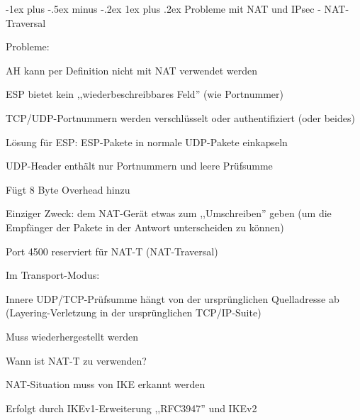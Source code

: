 \documentclass[a4paper]{article}
\makeatletter
\renewcommand{\subsubsection}{\@startsection{subsubsection}{3}{0mm}%
 {-1ex plus -.5ex minus -.2ex}%
 {1ex plus .2ex}%
 {\normalfont\small\bfseries}}
\makeatother
\begin{document}
\begin{multicols}{3}
      \subsubsection{Probleme mit NAT und IPsec - NAT-Traversal}
      \begin{itemize*}
            \item Probleme:
            \begin{itemize*}
                  \item AH kann per Definition nicht mit NAT verwendet werden
                  \item ESP bietet kein ,,wiederbeschreibbares Feld'' (wie Portnummer)
                  \item TCP/UDP-Portnummern werden verschlüsselt oder authentifiziert (oder beides)
            \end{itemize*}
            \item Lösung für ESP: ESP-Pakete in normale UDP-Pakete einkapseln
            \item UDP-Header enthält nur Portnummern und leere Prüfsumme
            \begin{itemize*}
                  \item Fügt 8 Byte Overhead hinzu
                  \item Einziger Zweck: dem NAT-Gerät etwas zum ,,Umschreiben'' geben (um die Empfänger der Pakete in der Antwort unterscheiden zu können)
                  \item Port 4500 reserviert für NAT-T (NAT-Traversal)
            \end{itemize*}
            \item Im Transport-Modus:
            \begin{itemize*}
                  \item Innere UDP/TCP-Prüfsumme hängt von der ursprünglichen Quelladresse ab (Layering-Verletzung in der ursprünglichen TCP/IP-Suite)
                  \item Muss wiederhergestellt werden
            \end{itemize*}
            \item Wann ist NAT-T zu verwenden?
            \begin{itemize*}
                  \item NAT-Situation muss von IKE erkannt werden
                  \item Erfolgt durch IKEv1-Erweiterung ,,RFC3947'' und IKEv2

\end{itemize*}
\end{itemize*}
\end{multicols}
\end{document}
